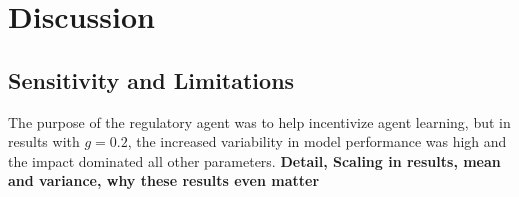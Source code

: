 \section{Discussion}
\label{sec:farm_disc}

\subsection{Sensitivity and Limitations}

The purpose of the regulatory agent was to help incentivize agent learning,
but in results with $g=0.2$, the increased variability in model performance
was high and the impact dominated all other parameters.
\textbf{Detail, Scaling in results, mean and variance, why these results
even matter}


